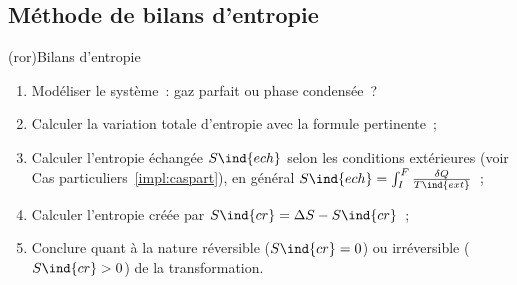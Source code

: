\documentclass[../../main/main.tex]{subfiles}
\begin{document}
\subsection{Méthode de bilans d'entropie}
\begin{tcb*}(ror){Bilans d'entropie}
	\begin{enumerate}[label=\sqenumi]
		\item Modéliser le système~: gaz parfait ou phase condensée~?
		\item Calculer la variation totale d'entropie avec la formule pertinente~;
		\item Calculer l'entropie échangée $S\ind{ech}$ selon les conditions
		      extérieures (voir Cas particuliers~\ref{impl:caspart}), en général
		      $S\ind{ech} = \int_{I}^{F} \frac{\delta{Q}}{T\ind{ext}}$~;
		\item Calculer l'entropie créée par $S\ind{cr} = \Delta{S} - S\ind{cr}$~;
		\item Conclure quant à la nature réversible ($S\ind{cr} = 0$) ou
		      irréversible ($S\ind{cr} > 0$) de la transformation.
	\end{enumerate}
\end{tcb*}
\end{document}
